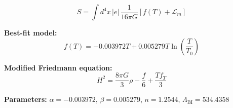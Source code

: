 
\begin{equation}
  S = \int d^4x \, |e| \, \frac{1}{16\pi G} \left[ f(T) + \mathcal{L}_m \right]
\end{equation}

\textbf{Best-fit model:}
\begin{equation}
  f(T) = -0.003972 T + 0.005279 T \ln\!\left(\frac{T}{T_0}\right)
\end{equation}

\textbf{Modified Friedmann equation:}
\begin{equation}
  H^2 = \frac{8\pi G}{3} \rho - \frac{f}{6} + \frac{T f_T}{3}
\end{equation}

\textbf{Parameters:}
$\alpha = -0.003972$, \quad
$\beta = 0.005279$, \quad
$n = 1.2544$, \quad
$\Lambda_{\text{BI}} = 534.4358$